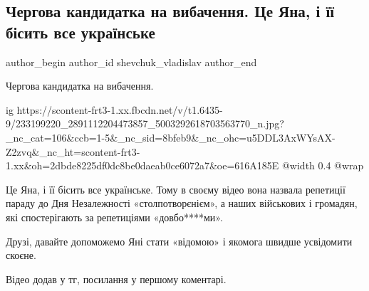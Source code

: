 
 
 
 
 
 
\subsection{Чергова кандидатка на вибачення. Це Яна, і її бісить все українське}
\label{sec:21_08_2021.fb.shevchuk_vladislav.1.izvinenia_ukrainstvo_nezalezhnist}
 
\ifcmt
 author_begin
   author_id shevchuk_vladislav
 author_end
\fi

Чергова кандидатка на вибачення.

\ifcmt
  ig https://scontent-frt3-1.xx.fbcdn.net/v/t1.6435-9/233199220_2891112204473857_5003292618703563770_n.jpg?_nc_cat=106&ccb=1-5&_nc_sid=8bfeb9&_nc_ohc=u5DDL3AxWYsAX-Z2zvq&_nc_ht=scontent-frt3-1.xx&oh=2dbde8225df0dc8be0daeab0ce6072a7&oe=616A185E
  @width 0.4
  @wrap 
\fi

Це Яна, і її бісить все українське. Тому в своєму відео вона назвала репетиції
параду до Дня Незалежності «столпотворєнієм», а наших військових і громадян,
які спостерігають за репетиціями «довбо****ми».

Друзі, давайте допоможемо Яні стати «відомою» і якомога швидше усвідомити
скоєне.

Відео додав у тг, посилання у першому коментарі.

